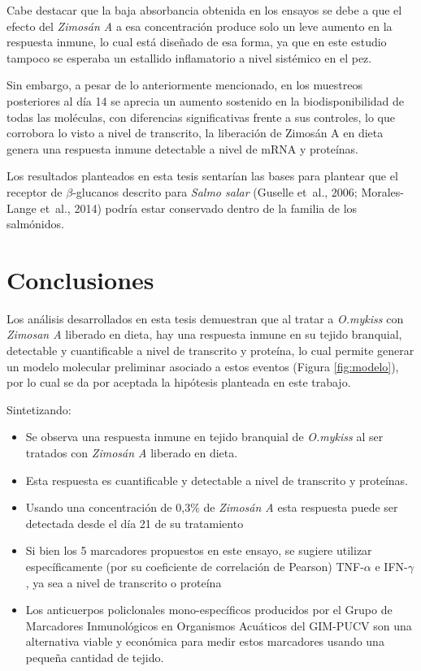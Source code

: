 \documentclass[12pt,letterpaper,oneside]{scrbook}
\begin{document}
Cabe destacar que la baja absorbancia obtenida en los ensayos se debe a
que el efecto del \emph{Zimosán A} a esa concentración produce solo un
leve aumento en la respuesta inmune, lo cual está diseñado de esa forma,
ya que en este estudio tampoco se esperaba un estallido inflamatorio a
nivel sistémico en el pez.

Sin embargo, a pesar de lo anteriormente mencionado, en los muestreos
posteriores al día 14 se aprecia un aumento sostenido en la
biodisponibilidad de todas las moléculas, con diferencias significativas
frente a sus controles, lo que corrobora lo visto a nivel de transcrito,
la liberación de Zimosán A en dieta genera una respuesta inmune
detectable a nivel de mRNA y proteínas.

Los resultados planteados en esta tesis sentarían las bases para
plantear que el receptor de \(\beta\)-glucanos descrito para
\emph{Salmo salar} (Guselle et~al., 2006; Morales-Lange et~al., 2014)
podría estar conservado dentro de la familia de los salmónidos.
\chapter{Conclusiones}

Los análisis desarrollados en esta tesis demuestran que al tratar a
\emph{O.mykiss} con \emph{Zimosan A} liberado en dieta, hay una
respuesta inmune en su tejido branquial, detectable y cuantificable a
nivel de transcrito y proteína, lo cual permite generar un modelo
molecular preliminar asociado a estos eventos (Figura \ref{fig:modelo}),
por lo cual se da por aceptada la hipótesis planteada en este trabajo.

Sintetizando:

\begin{itemize}
\item Se observa una respuesta inmune en tejido branquial de \emph{O.mykiss} al ser tratados con \emph{Zimosán A} liberado en dieta.
\item Esta respuesta es cuantificable y detectable a nivel de transcrito y proteínas.
\item Usando una concentración de 0,3\% de \emph{Zimosán A} esta respuesta puede ser detectada desde el día 21 de su tratamiento
\item Si bien los 5 marcadores propuestos en este ensayo, se sugiere utilizar específicamente (por su coeficiente de correlación de Pearson) TNF-$\alpha$ e IFN-$\gamma$, ya sea a nivel de transcrito o proteína
\item Los anticuerpos policlonales mono-específicos producidos por el Grupo de Marcadores Inmunológicos en Organismos Acuáticos del GIM-PUCV son una alternativa viable y económica para medir estos marcadores usando una pequeña cantidad de tejido.
\end{itemize}
\end{document}
